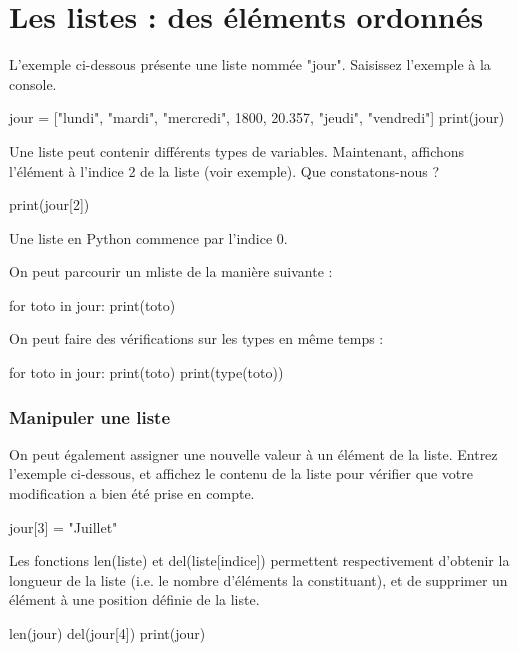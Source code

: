 \section{Les listes : des éléments ordonnés}

 L'exemple ci-dessous présente une liste nommée "jour". Saisissez l'exemple à la
console.

\begin{python}
jour = ["lundi", "mardi", "mercredi", 1800,
20.357, "jeudi", "vendredi"]
print(jour)
\end{python}

Une liste peut contenir différents types de variables.
 Maintenant, affichons l'élément à l'indice 2 de la liste (voir exemple). Que
constatons-nous ?

\begin{python}
print(jour[2])
\end{python}


Une liste en Python commence par l'indice 0.

On peut parcourir un mliste de la manière suivante :
\begin{python}
for toto in jour:
  print(toto)
\end{python}

On peut faire des vérifications sur les types en même temps :
\begin{python}
for toto in jour:
  print(toto)
  print(type(toto))
\end{python}

\subsubsection*{Manipuler une liste}

 On peut également assigner une nouvelle valeur à un élément de la liste. Entrez
l'exemple ci-dessous, et affichez le contenu de la liste pour vérifier que votre
modification a bien été prise en compte.

\begin{python}
jour[3] = "Juillet"
\end{python}

 Les fonctions len(liste) et del(liste[indice]) permettent respectivement d'obtenir la longueur de la liste (i.e. le nombre d'éléments la constituant), et de supprimer un élément à une position définie de la liste.

\begin{python}

len(jour)
del(jour[4])
print(jour)
\end{python}

